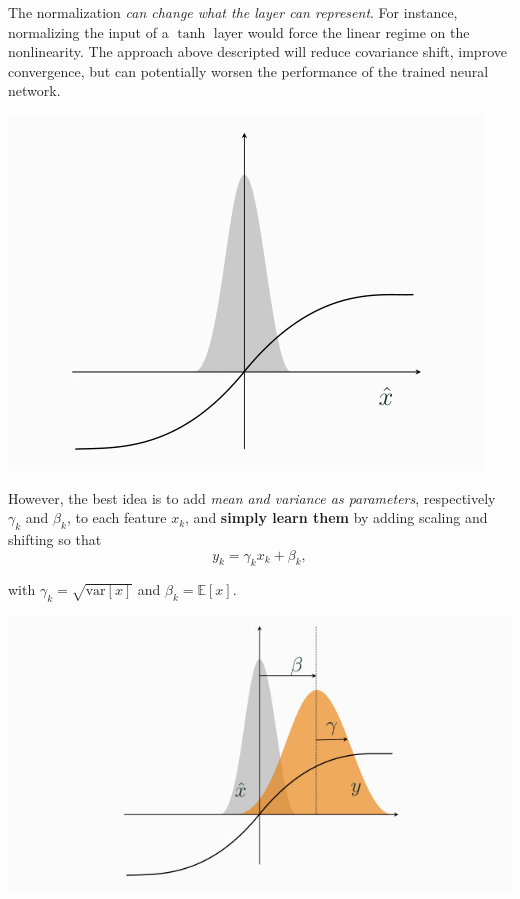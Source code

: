 \documentclass[10pt]{report}
\begin{document}
The normalization \emph{can change what the layer can represent}. For instance,
normalizing the input of a \(\tanh{}\) layer would force the linear
regime on the nonlinearity. The approach above descripted will reduce
covariance shift, improve convergence, but can potentially worsen the
performance of the trained neural network.

\begin{center}
\includegraphics[scale=0.4]{./pics/cnn/tanh.jpg}
\end{center}

However, the best idea is to add \emph{mean and variance as parameters},
respectively \(\gamma_k\) and \(\beta_k\), to each feature \(x_k\), and
\textbf{simply learn them} by adding scaling and shifting so that
\[ y_k = \gamma_k x_k + \beta_k, \]

with \(\gamma_k = \sqrt{\mbox{var}[x]}\) and
\(\beta_k = \mathbb{E}[x]\).

\begin{center}
\includegraphics[scale=0.35]{./pics/cnn/mean-variance-parameters.jpg}
\end{center}
\end{document}

